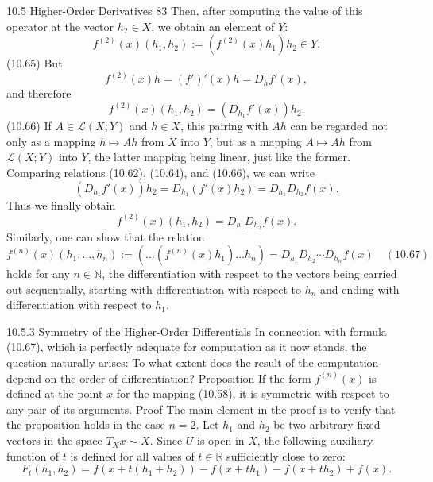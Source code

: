 10.5 Higher-Order Derivatives
83
Then, after computing the value of this operator at the vector $h_2 \in X$, we obtain an
element of $Y$:
$$f^{(2)} (x) (h_1, h_2) := (f^{(2)} (x)h_1)h_2 \in Y.$$
(10.65)
But
$$f^{(2)} (x)h = (f')'(x)h = D_h f'(x),$$
and therefore
$$f^{(2)} (x) (h_1, h_2) = (D_{h_1} f'(x))h_2.$$
(10.66)
If $A \in \mathcal{L}(X; Y)$ and $h \in X$, this pairing with $Ah$ can be regarded not only as a
mapping $h\mapsto Ah$ from $X$ into $Y$, but as a mapping $A \mapsto Ah$ from $\mathcal{L}(X; Y)$ into $Y$,
the latter mapping being linear, just like the former.
Comparing relations (10.62), (10.64), and (10.66), we can write
$$(D_{h_1} f'(x))h_2 = D_{h_1}(f'(x)h_2) = D_{h_1} D_{h_2} f (x).$$
Thus we finally obtain
$$f^{(2)} (x)(h_1, h_2) = D_{h_1} D_{h_2} f (x).$$
Similarly, one can show that the relation
$$f^{(n)}(x)(h_1,\ldots, h_n) := (\ldots (f^{(n)}(x)h_1)\ldots h_n) = D_{h_1} D_{h_2} \cdots D_{h_n} f (x) \quad (10.67)$$
holds for any $n \in \mathbb{N}$, the differentiation with respect to the vectors being carried
out sequentially, starting with differentiation with respect to $h_n$ and ending with
differentiation with respect to $h_1$.

10.5.3 Symmetry of the Higher-Order Differentials
In connection with formula (10.67), which is perfectly adequate for computation as
it now stands, the question naturally arises: To what extent does the result of the
computation depend on the order of differentiation?
Proposition If the form $f^{(n)} (x)$ is defined at the point $x$ for the mapping (10.58), it
is symmetric with respect to any pair of its arguments.
Proof The main element in the proof is to verify that the proposition holds in the
case $n = 2$.
Let $h_1$ and $h_2$ be two arbitrary fixed vectors in the space $T_Xx \sim X$. Since $U$ is
open in $X$, the following auxiliary function of $t$ is defined for all values of $t \in \mathbb{R}$
sufficiently close to zero:
$$F_t(h_1, h_2) = f (x + t(h_1+h_2)) - f (x + th_1) − f(x + th_2) + f (x).$$